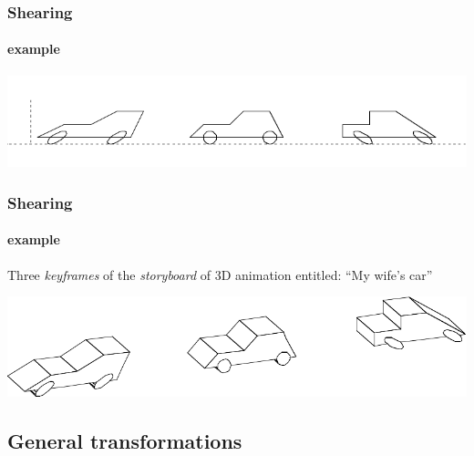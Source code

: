 \documentclass{beamer}
\begin{document}
\begin{frame}[fragile]
\frametitle{Shearing}
\framesubtitle{example}

\vfill

\includegraphics[width=\linewidth]{images/storyboard}


\end{frame}
\begin{frame}[fragile]
\frametitle{Shearing}
\framesubtitle{example}

Three  \emph{keyframes} of the \emph{storyboard} of 3D animation entitled: ``My wife's car''

\vfill

\centering\includegraphics[width=\linewidth]{images/story3D}
\vfill


\end{frame}

\subsection{General transformations}
\end{document}
